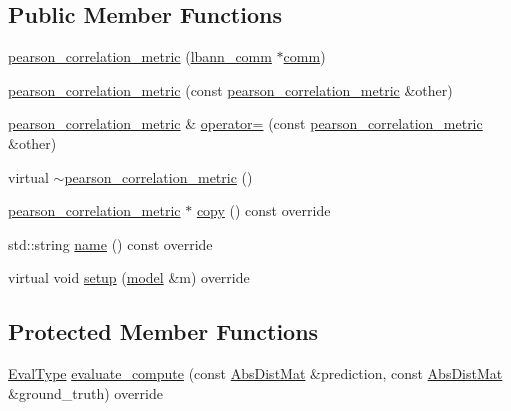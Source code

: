 \subsection*{Public Member Functions}
\begin{DoxyCompactItemize}
\item 
\hyperlink{classlbann_1_1pearson__correlation__metric_ac0d93a18b2eb500db51f40311a3b3634}{pearson\+\_\+correlation\+\_\+metric} (\hyperlink{classlbann_1_1lbann__comm}{lbann\+\_\+comm} $\ast$\hyperlink{file__io_8cpp_ab048c6f9fcbcfaa57ce68b00263dbebe}{comm})
\item 
\hyperlink{classlbann_1_1pearson__correlation__metric_a52f03d952d693a58d6865b5c62b021af}{pearson\+\_\+correlation\+\_\+metric} (const \hyperlink{classlbann_1_1pearson__correlation__metric}{pearson\+\_\+correlation\+\_\+metric} \&other)
\item 
\hyperlink{classlbann_1_1pearson__correlation__metric}{pearson\+\_\+correlation\+\_\+metric} \& \hyperlink{classlbann_1_1pearson__correlation__metric_a5b88759076bc2f827b726e1541467b56}{operator=} (const \hyperlink{classlbann_1_1pearson__correlation__metric}{pearson\+\_\+correlation\+\_\+metric} \&other)
\item 
virtual \hyperlink{classlbann_1_1pearson__correlation__metric_adaa97af452924a44c3894e44e9835923}{$\sim$pearson\+\_\+correlation\+\_\+metric} ()
\item 
\hyperlink{classlbann_1_1pearson__correlation__metric}{pearson\+\_\+correlation\+\_\+metric} $\ast$ \hyperlink{classlbann_1_1pearson__correlation__metric_a2bb107028c6931a70ed7d886707b4006}{copy} () const override
\item 
std\+::string \hyperlink{classlbann_1_1pearson__correlation__metric_a7cbb12e258acdb0cbc4d521dc7163dd6}{name} () const override
\item 
virtual void \hyperlink{classlbann_1_1pearson__correlation__metric_a4394c0ebb3cacdcec934e4ae322f9bb6}{setup} (\hyperlink{classlbann_1_1model}{model} \&m) override
\end{DoxyCompactItemize}
\subsection*{Protected Member Functions}
\begin{DoxyCompactItemize}
\item 
\hyperlink{base_8hpp_a3266f5ac18504bbadea983c109566867}{Eval\+Type} \hyperlink{classlbann_1_1pearson__correlation__metric_a28453718aa09d609ef5ab157823d8c24}{evaluate\+\_\+compute} (const \hyperlink{base_8hpp_a9a697a504ae84010e7439ffec862b470}{Abs\+Dist\+Mat} \&prediction, const \hyperlink{base_8hpp_a9a697a504ae84010e7439ffec862b470}{Abs\+Dist\+Mat} \&ground\+\_\+truth) override
\end{DoxyCompactItemize}
